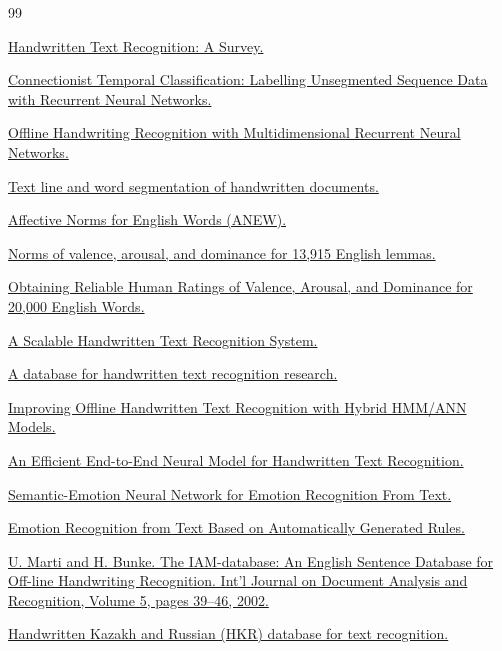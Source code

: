 \documentclass[12pt,a4paper]{article}
\begin{document}
\clearpage
{}
\begin{thebibliography}{99}

\href{https://ieeexplore.ieee.org/abstract/document/11303599}
{Handwritten Text Recognition: A Survey.}

\href{https://www.cs.toronto.edu/~graves/icml_2006.pdf}
{Connectionist Temporal Classification: Labelling Unsegmented Sequence Data with Recurrent Neural Networks.}

\href{https://papers.nips.cc/paper_files/paper/2008/hash/66368270ffd51418ec58bd793f2d9b1b-Abstract.html}
{Offline Handwriting Recognition with Multidimensional Recurrent Neural Networks.}

\href{https://users.iit.demokritos.gr/~bgat/Louloud_1_2009.pdf}
{Text line and word segmentation of handwritten documents.}

\href{https://pdodds.w3.uvm.edu/teaching/courses/2009-08UVM-300/docs/others/everything/bradley1999a.pdf}
{Affective Norms for English Words (ANEW).}

\href{https://pubmed.ncbi.nlm.nih.gov/23404613/}
{Norms of valence, arousal, and dominance for 13,915 English lemmas.}

\href{https://aclanthology.org/P18-1017/}
{Obtaining Reliable Human Ratings of Valence, Arousal, and Dominance for 20,000 English Words.}

\href{https://ieeexplore.ieee.org/abstract/document/8977983}
{A Scalable Handwritten Text Recognition System.}

\href{https://ieeexplore.ieee.org/abstract/document/291440}
{A database for handwritten text recognition research.}

\href{https://ieeexplore.ieee.org/abstract/document/5551147}
{Improving Offline Handwritten Text Recognition with Hybrid HMM/ANN Models.}

\href{https://arxiv.org/abs/1807.07965}
{An Efficient End-to-End Neural Model for Handwritten Text Recognition.}

\href{https://ieeexplore.ieee.org/abstract/document/8794541}
{Semantic-Emotion Neural Network for Emotion Recognition From Text.}

\href{https://ieeexplore.ieee.org/stamp/stamp.jsp?tp=&arnumber=7022622}
{Emotion Recognition from Text Based on Automatically Generated Rules.}

\href{https://fki.tic.heia-fr.ch/databases/iam-handwriting-database}
{U. Marti and H. Bunke. The IAM-database:
An English Sentence Database for Off-line
Handwriting Recognition. Int'l Journal on
Document Analysis and Recognition, Volume 5, pages 39--46, 2002.}

\href{https://link.springer.com/article/10.1007/s11042-021-11399-6}
{Handwritten Kazakh and Russian (HKR) database for text recognition.}
\end{thebibliography}
\end{document}
